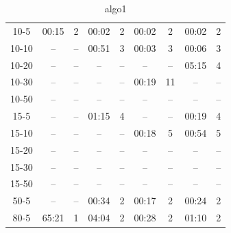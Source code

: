 \documentclass[
  digital, %
  oneside, %
  notable,   %
  lof,     %
  nolot,     %
]{fithesis3}
\begin{document}
\begin{table}[]
{\begin{tabular}{c|cc|cc|cc|cc}
10-5  & 00:15  &  2  & 00:02  &  2  & 00:02  &  2  & 00:02  &  2  \\
10-10  & --  &  --  & 00:51  &  3  & 00:03  &  3  & 00:06  &  3  \\
10-20  & --  &  --  & --  &  --  & --  &  --  & 05:15  &  4  \\
10-30  & --  &  --  & --  &  --  & 00:19  &  11  & --  &  -- \\
10-50  & --  &  --  & --  &  --  & --  &  --  & --  &  --  \\ \hline
15-5  & --  &  --  & 01:15  &  4  & --  &  --  & 00:19  &  4  \\
15-10  & --  &  --  & --  &  --  & 00:18  &  5  & 00:54  &  5  \\
15-20  & --  &  --  & --  &  --  & --  &  --  & --  &  --  \\
15-30  & --  &  --  & --  &  --  & --  &  --  & --  &  --  \\
15-50  & --  &  --  & --  &  --  & --  &  --  & --  &  --  \\ \hline
50-5  & --  &  --  & 00:34  &  2  & 00:17  &  2  & 00:24  &  2  \\ \hline
80-5  & 65:21  &  1  & 04:04  &  2  & 00:28  &  2  & 01:10  &  2 \\


\end{tabular}%
}
\caption{algo1}
\label{tab:algo1}
\end{table}
\end{document}
